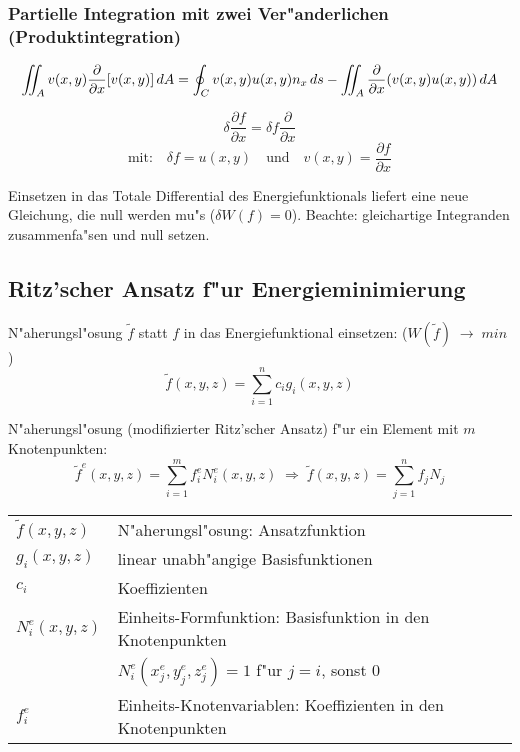 \subsubsection{Partielle Integration mit zwei Ver"anderlichen (Produktintegration)}
$$\IINT_A v(x,y)\frac{\partial}{\partial x}[v(x,y)]\,dA=\oint_C
   v(x,y)u(x,y)n_x \,ds-\IINT_A \frac{\partial}{\partial
   x}(v(x,y)u(x,y))\,dA$$

$$\delta \frac{\partial f}{\partial x} = \delta f \frac{\partial}{\partial x} $$
$$\mbox{mit:}\quad  \delta f = u(x,y) \quad\mbox{und}\quad v(x,y) =
  \frac{\partial f}{\partial x} $$

Einsetzen in das Totale Differential des Energiefunktionals liefert eine neue
Gleichung, die null werden mu"s ($\delta W(f)=0$). Beachte: gleichartige
Integranden zusammenfa"sen und null setzen.

\subsection{Ritz'scher Ansatz f"ur Energieminimierung}
N"aherungsl"osung $\tilde{f}$ statt $f$ in das Energiefunktional einsetzen:
 ($W(\tilde{f})\; \rightarrow \; min$)
$$\tilde{f}(x,y,z)=\sum_{i=1}^n c_i g_i (x,y,z)$$

N"aherungsl"osung (modifizierter Ritz'scher Ansatz) f"ur ein Element
mit $m$ Knotenpunkten:
$$\tilde{f}^e(x,y,z) = \sum_{i=1}^m f_i^e N_i^e(x,y,z)\;\Rightarrow\;
  \tilde{f}(x,y,z) = \sum_{j=1}^n f_j N_j$$

\begin{tabular}{l@{ --- }l}
$\tilde{f}(x,y,z)$ & N"aherungsl"osung: Ansatzfunktion\\
$g_i(x,y,z)$       & linear unabh"angige Basisfunktionen \\
$c_i$              & Koeffizienten\\[1ex]
$N_i^e(x,y,z)$     & Einheits-Formfunktion: Basisfunktion in den Knotenpunkten\\
                   & $N_i^e(x_j^e,y_j^e,z_j^e) = 1$ f"ur $j=i$, sonst $0$\\
$f_i^e$            & Einheits-Knotenvariablen: Koeffizienten in den Knotenpunkten\\
\end{tabular}

